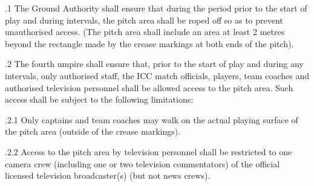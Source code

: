 \documentclass[12pt]{article}
\begin{document}
\vspace{\baselineskip}
\begin{adjustwidth}{0.5in}{0.12in}
{\fontsize{9pt}{10.8pt}.1 \tabto{0.49in} The Ground Authority shall ensure that during the period prior to the start of play and during intervals, the pitch area shall be roped off so as to prevent unauthorised access. (The pitch area shall include an area at least 2 metres beyond the rectangle made by the crease markings at both ends of the pitch).\par}\par

\end{adjustwidth}


\vspace{\baselineskip}
\begin{adjustwidth}{0.5in}{0.08in}
\begin{justify}
{\fontsize{9pt}{10.8pt}.2 \tabto{0.49in} The fourth umpire shall ensure that, prior to the start of play and during any intervals, only authorised staff, the ICC match officials, players, team coaches and authorised television personnel shall be allowed access to the pitch area. Such access shall be subject to the following limitations:\par}
\end{justify}\par

\end{adjustwidth}


\vspace{\baselineskip}
\begin{adjustwidth}{1.18in}{0.39in}
{\fontsize{9pt}{10.8pt}.2.1 \tabto{1.17in} Only captains and team coaches may walk on the actual playing surface of the pitch area (outside of the crease markings).\par}\par

\end{adjustwidth}


\vspace{\baselineskip}
\begin{adjustwidth}{1.18in}{0.11in}
{\fontsize{9pt}{10.8pt}.2.2 \tabto{1.17in} Access to the pitch area by television personnel shall be restricted to one camera crew (including one or two television commentators) of the official licensed television broadcaster(s) (but not news crews).\par}\par

\end{adjustwidth}
\end{document}
